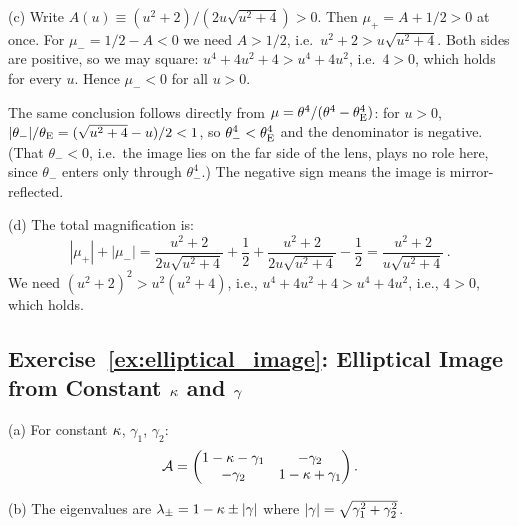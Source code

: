 (c) Write $A(u) \equiv (u^2+2)/(2u\sqrt{u^2+4}) > 0$.  Then
$\mu_+ = A + 1/2 > 0$ at once.  For $\mu_- = 1/2 - A < 0$ we need
$A > 1/2$, i.e.\ $u^2 + 2 > u\sqrt{u^2+4}$.  Both sides are positive,
so we may square: $u^4 + 4u^2 + 4 > u^4 + 4u^2$, i.e.\ $4 > 0$, which
holds for every $u$.  Hence $\mu_- < 0$ for all $u > 0$.

The same conclusion follows directly from
$\mu = \theta^4/(\theta^4 - \theta_{\mathrm{E}}^4)$: for $u > 0$,
$|\theta_-|/\theta_{\mathrm{E}} = (\sqrt{u^2+4} - u)/2 < 1$, so
$\theta_-^4 < \theta_{\mathrm{E}}^4$ and the denominator is negative.  (That
$\theta_- < 0$, i.e.\ the image lies on the far side of the lens, plays
no role here, since $\theta_-$ enters only through $\theta_-^4$.)
The negative sign means the image is mirror-reflected. \checkmark

(d) The total magnification is:
\begin{equation*}
    |\mu_+| + |\mu_-| = \frac{u^2+2}{2u\sqrt{u^2+4}} + \frac{1}{2}
    + \frac{u^2+2}{2u\sqrt{u^2+4}} - \frac{1}{2}
    = \frac{u^2+2}{u\sqrt{u^2+4}} \,.
\end{equation*}
We need $(u^2+2)^2 > u^2(u^2+4)$, i.e.,
$u^4 + 4u^2 + 4 > u^4 + 4u^2$, i.e., $4 > 0$, which holds. \checkmark

\subsection*{Exercise~\ref{ex:elliptical_image}: Elliptical Image from Constant $\kappa$ and $\gamma$}

(a) For constant $\kappa$, $\gamma_1$, $\gamma_2$:
\begin{equation*}
    \mathcal{A} = \begin{pmatrix}
    1 - \kappa - \gamma_1 & -\gamma_2 \\
    -\gamma_2 & 1 - \kappa + \gamma_1
    \end{pmatrix} .
\end{equation*}

(b) The eigenvalues are $\lambda_\pm = 1 - \kappa \pm |\gamma|$
where $|\gamma| = \sqrt{\gamma_1^2 + \gamma_2^2}$.

